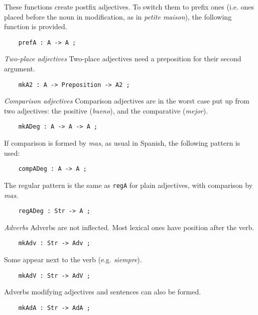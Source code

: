 \documentclass[11pt,a4paper]{article}
\newcommand{\subsubsubsection}[1]{\textit{#1}}
\begin{document}
These functions create postfix adjectives. To switch
them to prefix ones (i.e. ones placed before the noun in
modification, as in \textit{petite maison}), the following function is
provided.

\begin{verbatim}
    prefA : A -> A ;
\end{verbatim}

\subsubsubsection{Two-place adjectives}
Two-place adjectives need a preposition for their second argument.

\begin{verbatim}
    mkA2 : A -> Preposition -> A2 ;
\end{verbatim}

\subsubsubsection{Comparison adjectives}
Comparison adjectives are in the worst case put up from two
adjectives: the positive (\textit{bueno}), and the comparative (\textit{mejor}). 

\begin{verbatim}
    mkADeg : A -> A -> A ;
\end{verbatim}

If comparison is formed by \textit{mas}, as usual in Spanish,
the following pattern is used:

\begin{verbatim}
    compADeg : A -> A ;
\end{verbatim}

The regular pattern is the same as \texttt{regA} for plain adjectives, 
with comparison by \textit{mas}.

\begin{verbatim}
    regADeg : Str -> A ;
\end{verbatim}

\subsubsubsection{Adverbs}
Adverbs are not inflected. Most lexical ones have position
after the verb. 

\begin{verbatim}
    mkAdv : Str -> Adv ;
\end{verbatim}

Some appear next to the verb (e.g. \textit{siempre}).

\begin{verbatim}
    mkAdV : Str -> AdV ;
\end{verbatim}

Adverbs modifying adjectives and sentences can also be formed.

\begin{verbatim}
    mkAdA : Str -> AdA ;
\end{verbatim}
\end{document}
